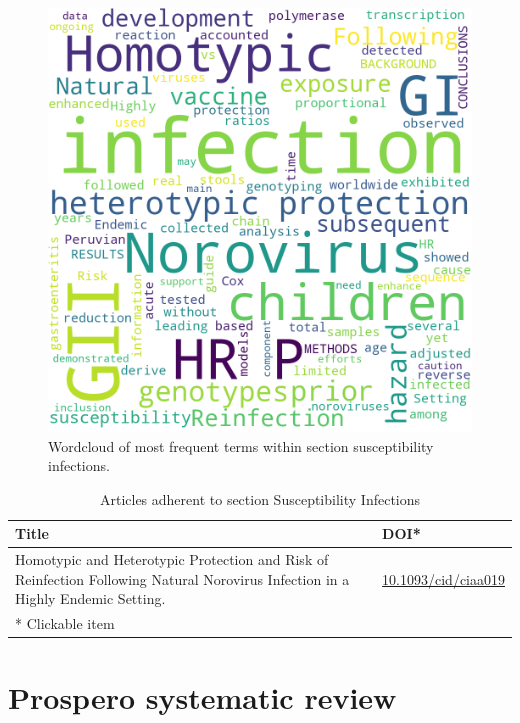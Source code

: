\documentclass{qqtarticle}
\begin{document}
        \begin{figure}[H]
            \centering
            \includegraphics[width=.75\linewidth]{img/susceptibilityinfections.png}
            \caption{Wordcloud of most frequent terms within section susceptibility infections.}
            \label{fig:wcl_susceptibilityinfections}
        \end{figure}

        \begin{table}[H]
            \scriptsize
            \centering
            \caption{Articles adherent to section Susceptibility Infections}
            \renewcommand{\arraystretch}{1.5}
            \begin{tabular}{p{}l}
                \toprule 
                Title & DOI* \\     \midrule Homotypic and Heterotypic Protection and Risk of Reinfection Following Natural Norovirus Infection in a Highly Endemic Setting. \cite{Homotypice0418018} & \href{https://dx.doi.org/10.1093/cid/ciaa019}{10.1093/cid/ciaa019}\\     \midrule
                * Clickable item \\
                \bottomrule
            \end{tabular}
            \label{tab:topic15}
        \end{table}
    
    \section{Prospero systematic review}
\end{document}
